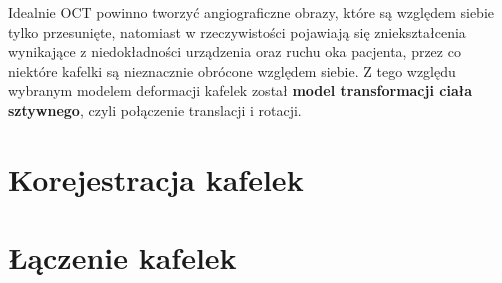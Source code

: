 Idealnie OCT powinno tworzyć angiograficzne obrazy, które są względem siebie tylko przesunięte, natomiast w rzeczywistości pojawiają się zniekształcenia wynikające z niedokładności urządzenia oraz ruchu oka pacjenta, przez co niektóre kafelki są nieznacznie obrócone względem siebie. Z tego względu wybranym modelem deformacji kafelek został \textbf{model transformacji ciała sztywnego}, czyli połączenie translacji i rotacji.

\section{Korejestracja kafelek}
\label{sec:algorytmy_korejestracji:korejestracja_kafelek}

\section{Łączenie kafelek}
\label{sec:algorytmy_korejestracji:laczenie_kafelek}























